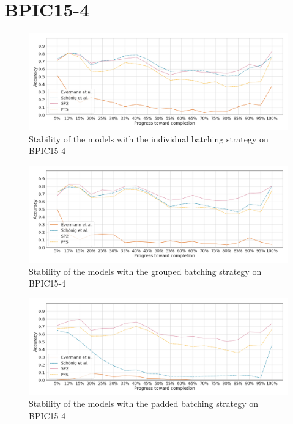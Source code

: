\section*{BPIC15-4}
\begin{figure}[!htb]
    \centering
    \includegraphics[width=\textwidth]{gfx/bpic2015_4/individual_stability.png}
    \caption{Stability of the models with the individual batching strategy on BPIC15-4}
    \label{fig:bpic15-4-individual-stability}
\end{figure}
\begin{figure}[!htb]
    \centering
    \includegraphics[width=\textwidth]{gfx/bpic2015_4/grouped_stability.png}
    \caption{Stability of the models with the grouped batching strategy on BPIC15-4}
    \label{fig:bpic15-4-grouped-stability}
\end{figure}
\begin{figure}[!htb]
    \centering
    \includegraphics[width=\textwidth]{gfx/bpic2015_4/padded_stability.png}
    \caption{Stability of the models with the padded batching strategy on BPIC15-4}
    \label{fig:bpic15-4-padded-stability}
\end{figure}
